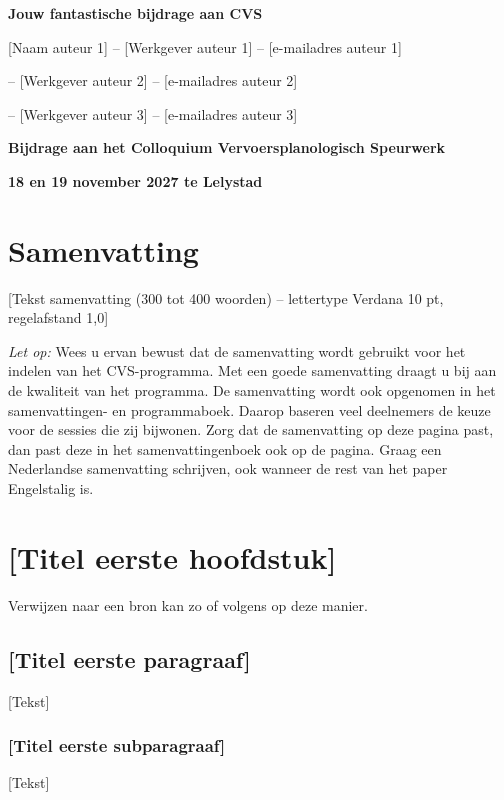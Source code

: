 \documentclass[10pt, a4paper]{article}
\begin{document}
\thispagestyle{empty}

\begin{center}
    \textbf{\large Jouw fantastische bijdrage aan CVS} \par
    \vspace{0.5cm}
    \begin{minipage}{\textwidth}
        \centering
        \normalsize
        [Naam auteur 1] -- [Werkgever auteur 1] -- [e-mailadres auteur 1] \par
        [Naam auteur 2] -- [Werkgever auteur 2] -- [e-mailadres auteur 2] \par
        [Naam auteur 3] -- [Werkgever auteur 3] -- [e-mailadres auteur 3]
    \end{minipage}
    \vspace{0.5cm}

    \begin{minipage}{\textwidth}
        \centering
        \normalsize
        \textbf{Bijdrage aan het Colloquium Vervoersplanologisch Speurwerk} \par
        \textbf{18 en 19 november 2027 te Lelystad}
    \end{minipage}
\end{center}

\section*{Samenvatting}
[Tekst samenvatting (300 tot 400 woorden) – lettertype Verdana 10 pt, regelafstand 1,0] 

\textit{Let op:}
Wees u ervan bewust dat de samenvatting wordt gebruikt voor het indelen van het CVS-programma. Met een goede samenvatting draagt u bij aan de kwaliteit van het programma. De samenvatting wordt ook opgenomen in het samenvattingen- en programmaboek. Daarop baseren veel deelnemers de keuze voor de sessies die zij bijwonen. Zorg dat de samenvatting op deze pagina past, dan past deze in het samenvattingenboek ook op de pagina. Graag een Nederlandse samenvatting schrijven, ook wanneer de rest van het paper Engelstalig is.

\pagebreak

\section{[Titel eerste hoofdstuk]}
Verwijzen naar een bron kan zo \citep{borsje2026} of volgens \citet{borsje2026} op deze manier.

\subsection{[Titel eerste paragraaf]}
[Tekst]

\subsubsection*{[Titel eerste subparagraaf]}
[Tekst]


\end{document}
